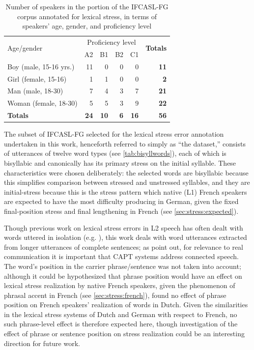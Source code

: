 	
		\begin{table}
			\centering
			\caption[Speakers in the annotated dataset]{Number of speakers in the portion of the IFCASL-FG corpus annotated for lexical stress, in terms of speakers' age, gender, and proficiency level \citep{Fauth2014}}
			\begin{tabular}{lrrrrr}
			\toprule
			\multirow{2}{*}{Age/gender}	&	\multicolumn{4}{c}{Proficiency level} &\multirow{2}{*}{\textbf{Totals}}\\
			\cmidrule(lr){2-5}
		& A2	&	B1	&	B2	&	C1	&		\\
			\midrule
Boy (male, 15-16 yrs.)	&	11	&	0	&	0	&	0	&	\textbf{11}	\\
Girl (female, 15-16)&	1	&	1	&	0	&	0	&	\textbf{2}	\\
Man	(male, 18-30) &	7	&	4	&	3	&	7	&	\textbf{21}	\\
Woman	 (female, 18-30)&	5	&	5	&	3	&	9	&	\textbf{22}	\\
\textbf{Totals}	&	\textbf{24}	&	\textbf{10}	&	\textbf{6}	&	\textbf{16}	&	\textbf{56}	\\
			\bottomrule
			\end{tabular}
			\label{tab:data:speakers}
		\end{table}
	
	
	The subset of IFCASL-FG selected for the lexical stress error annotation undertaken in this work, henceforth referred to simply as ``the dataset,''
	 consists of utterances of twelve word types (see \cref{tab:bisyllwords}), each of which is bisyllabic and canonically has its primary stress on the initial syllable. These characteristics were chosen deliberately: the selected words are bisyllabic because this simplifies comparison between stressed and unstressed syllables, and they are initial-stress because this is the stress pattern which native (L1) French speakers are expected to have the most difficulty producing in German, given the fixed final-position stress and final lengthening in French (see \cref{sec:stress:expected}). 
	
	Though previous work on lexical stress errors in L2 speech has often dealt with words uttered in isolation (e.g. \cite{Bonneau2011}), this work deals with word utterances extracted from longer utterances of complete sentences; as \textcite[p.~6]{Neri2002} point out, for relevance to real communication it is important that CAPT systems address connected speech. The word's position in the carrier phrase/sentence was not taken into account; although it could be hypothesized that phrase position would have an effect on lexical stress realization by native French speakers, given the phenomenon of phrasal accent in French (see \cref{sec:stress:french}), \textcite{Michaux2013} found no effect of phrase position on French speakers' realization of words in Dutch. Given the similarities in the lexical stress systems of Dutch and German with respect to French, no such phrase-level effect is therefore expected here, though investigation of the effect of phrase or sentence position on stress realization could be an interesting direction for future work.
	
